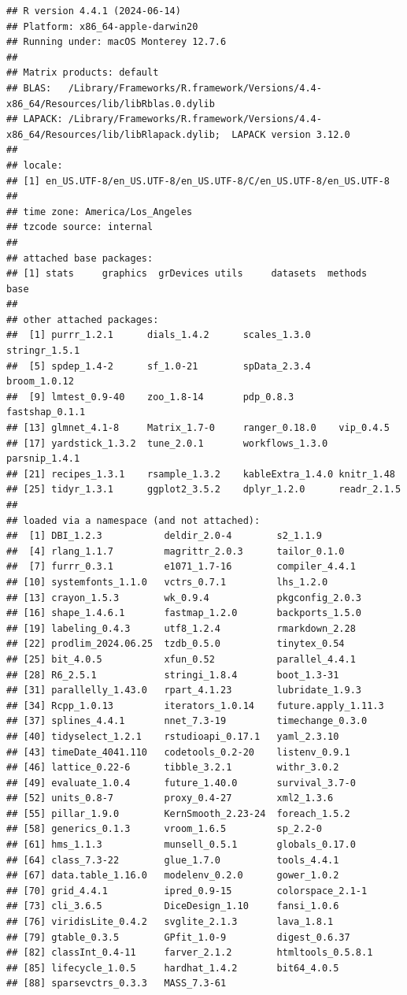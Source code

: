 \documentclass[
  11pt,
]{article}
\begin{document}
\begin{verbatim}
## R version 4.4.1 (2024-06-14)
## Platform: x86_64-apple-darwin20
## Running under: macOS Monterey 12.7.6
## 
## Matrix products: default
## BLAS:   /Library/Frameworks/R.framework/Versions/4.4-x86_64/Resources/lib/libRblas.0.dylib 
## LAPACK: /Library/Frameworks/R.framework/Versions/4.4-x86_64/Resources/lib/libRlapack.dylib;  LAPACK version 3.12.0
## 
## locale:
## [1] en_US.UTF-8/en_US.UTF-8/en_US.UTF-8/C/en_US.UTF-8/en_US.UTF-8
## 
## time zone: America/Los_Angeles
## tzcode source: internal
## 
## attached base packages:
## [1] stats     graphics  grDevices utils     datasets  methods   base     
## 
## other attached packages:
##  [1] purrr_1.2.1      dials_1.4.2      scales_1.3.0     stringr_1.5.1   
##  [5] spdep_1.4-2      sf_1.0-21        spData_2.3.4     broom_1.0.12    
##  [9] lmtest_0.9-40    zoo_1.8-14       pdp_0.8.3        fastshap_0.1.1  
## [13] glmnet_4.1-8     Matrix_1.7-0     ranger_0.18.0    vip_0.4.5       
## [17] yardstick_1.3.2  tune_2.0.1       workflows_1.3.0  parsnip_1.4.1   
## [21] recipes_1.3.1    rsample_1.3.2    kableExtra_1.4.0 knitr_1.48      
## [25] tidyr_1.3.1      ggplot2_3.5.2    dplyr_1.2.0      readr_2.1.5     
## 
## loaded via a namespace (and not attached):
##  [1] DBI_1.2.3           deldir_2.0-4        s2_1.1.9           
##  [4] rlang_1.1.7         magrittr_2.0.3      tailor_0.1.0       
##  [7] furrr_0.3.1         e1071_1.7-16        compiler_4.4.1     
## [10] systemfonts_1.1.0   vctrs_0.7.1         lhs_1.2.0          
## [13] crayon_1.5.3        wk_0.9.4            pkgconfig_2.0.3    
## [16] shape_1.4.6.1       fastmap_1.2.0       backports_1.5.0    
## [19] labeling_0.4.3      utf8_1.2.4          rmarkdown_2.28     
## [22] prodlim_2024.06.25  tzdb_0.5.0          tinytex_0.54       
## [25] bit_4.0.5           xfun_0.52           parallel_4.4.1     
## [28] R6_2.5.1            stringi_1.8.4       boot_1.3-31        
## [31] parallelly_1.43.0   rpart_4.1.23        lubridate_1.9.3    
## [34] Rcpp_1.0.13         iterators_1.0.14    future.apply_1.11.3
## [37] splines_4.4.1       nnet_7.3-19         timechange_0.3.0   
## [40] tidyselect_1.2.1    rstudioapi_0.17.1   yaml_2.3.10        
## [43] timeDate_4041.110   codetools_0.2-20    listenv_0.9.1      
## [46] lattice_0.22-6      tibble_3.2.1        withr_3.0.2        
## [49] evaluate_1.0.4      future_1.40.0       survival_3.7-0     
## [52] units_0.8-7         proxy_0.4-27        xml2_1.3.6         
## [55] pillar_1.9.0        KernSmooth_2.23-24  foreach_1.5.2      
## [58] generics_0.1.3      vroom_1.6.5         sp_2.2-0           
## [61] hms_1.1.3           munsell_0.5.1       globals_0.17.0     
## [64] class_7.3-22        glue_1.7.0          tools_4.4.1        
## [67] data.table_1.16.0   modelenv_0.2.0      gower_1.0.2        
## [70] grid_4.4.1          ipred_0.9-15        colorspace_2.1-1   
## [73] cli_3.6.5           DiceDesign_1.10     fansi_1.0.6        
## [76] viridisLite_0.4.2   svglite_2.1.3       lava_1.8.1         
## [79] gtable_0.3.5        GPfit_1.0-9         digest_0.6.37      
## [82] classInt_0.4-11     farver_2.1.2        htmltools_0.5.8.1  
## [85] lifecycle_1.0.5     hardhat_1.4.2       bit64_4.0.5        
## [88] sparsevctrs_0.3.3   MASS_7.3-61
\end{verbatim}
\end{document}

